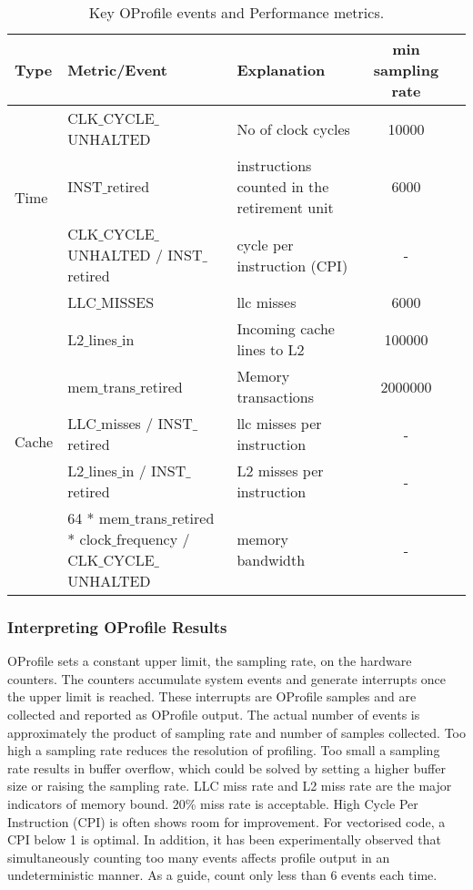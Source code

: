\documentclass[journal]{IEEEtran}
\begin{document}
\begin{table*}[ht]
\centering
\begin{tabular}{l l l c c}
\hline
Type 					& Metric/Event   			& Explanation  					& min sampling rate	\\
\hline\hline
\multirow{3}{*}{Time}
& CLK$\_$CYCLE$\_$UNHALTED 						& No of clock cycles 				& 10000			\\
& INST$\_$retired  							& instructions counted in the retirement unit 	& 6000		\\	
& CLK$\_$CYCLE$\_$UNHALTED / INST$\_$retired 				& cycle per instruction	(CPI)			& -			\\

\hline

\multirow{6}{*}{Cache}
& LLC$\_$MISSES								& llc misses					& 6000			\\
& L2$\_$lines$\_$in							& Incoming cache lines to L2			& 100000	\\	
& mem$\_$trans$\_$retired                   & Memory transactions                   & 2000000     \\ 

& LLC$\_$misses / INST$\_$retired 					& llc misses per instruction			& -			\\
& L2$\_$lines$\_$in / INST$\_$retired 					& L2 misses per instruction 			& -			\\
& 64 * mem$\_$trans$\_$retired * clock$\_$frequency / CLK$\_$CYCLE$\_$UNHALTED 					& memory bandwidth 			& -			\\


\hline
\end{tabular}
\caption{Key OProfile events and Performance metrics.}\label{Operfmetrics}
\end{table*}

\subsubsection{Interpreting OProfile Results}
OProfile sets a constant upper limit, the sampling rate, on the hardware counters. The counters accumulate system events and generate interrupts once the upper limit is reached. These interrupts are OProfile samples and are collected and reported as OProfile output. The actual number of events is approximately the product of sampling rate and number of samples collected. Too high a sampling rate reduces the resolution of profiling. Too small a sampling rate results in buffer overflow, which could be solved by setting a higher buffer size or raising the sampling rate. 
LLC miss rate and L2 miss rate are the major indicators of memory bound. 20\% miss rate is acceptable\cite{themanual}. High Cycle Per Instruction (CPI) is often shows room for improvement. For vectorised code, a CPI below 1 is optimal.
In addition, it has been experimentally observed that simultaneously counting too many events affects profile output in an undeterministic manner. As a guide, count only less than 6 events each time. \\
\end{document}
